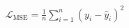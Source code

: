 \documentclass[preview]{standalone}
\begin{document}
\begin{align*}
\mathcal{L}_{\text{MSE}} = \frac{1}{n}\sum_{i=1}^{n}(y_i - \hat{y}_i)^2
\end{align*}
\end{document}
